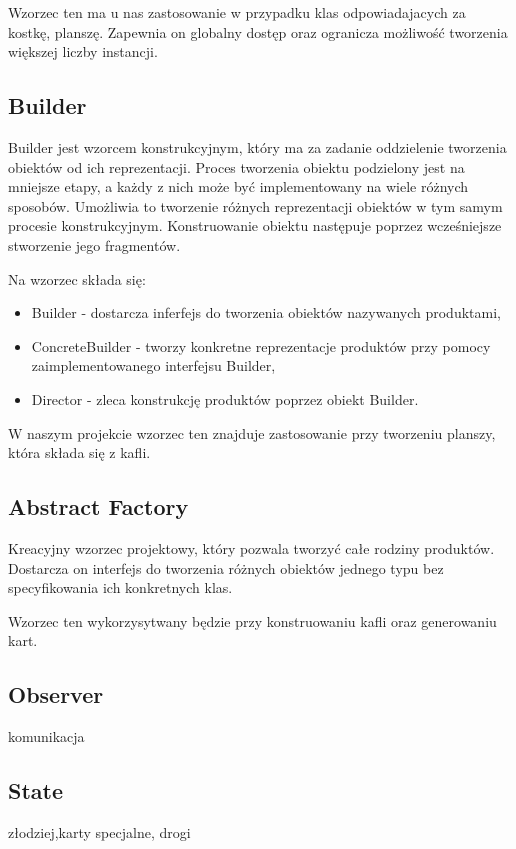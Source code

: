 \documentclass[a4paper, 11pt]{article}
\begin{document}
Wzorzec ten ma u nas zastosowanie w przypadku klas odpowiadajacych za kostkę, planszę. Zapewnia on globalny dostęp oraz ogranicza możliwość tworzenia większej liczby instancji. 

	\subsection{Builder}
	\indent
	
Builder jest wzorcem konstrukcyjnym, który ma za zadanie oddzielenie tworzenia obiektów od ich reprezentacji. 
Proces tworzenia obiektu podzielony jest na mniejsze etapy, a każdy z nich może być implementowany na wiele różnych sposobów. Umożliwia to tworzenie różnych reprezentacji obiektów w tym samym procesie konstrukcyjnym.
Konstruowanie obiektu następuje poprzez wcześniejsze stworzenie jego fragmentów.


Na wzorzec składa się:
\begin{itemize}

\item Builder - dostarcza inferfejs do tworzenia obiektów nazywanych produktami,
\item ConcreteBuilder - tworzy konkretne reprezentacje produktów przy pomocy zaimplementowanego interfejsu Builder,
\item Director - zleca konstrukcję produktów poprzez obiekt Builder.
\end{itemize}

W naszym projekcie wzorzec ten znajduje zastosowanie przy tworzeniu planszy, która składa się z kafli.


	\subsection{Abstract Factory}
\indent

Kreacyjny wzorzec projektowy, który pozwala tworzyć całe rodziny produktów. Dostarcza on interfejs do tworzenia różnych obiektów jednego typu bez specyfikowania ich konkretnych klas.

Wzorzec ten wykorzysytwany będzie przy konstruowaniu kafli oraz generowaniu kart.


	\subsection{Observer}
	komunikacja\\
	\subsection{State}
	złodziej,karty specjalne, drogi\\
\end{document}
